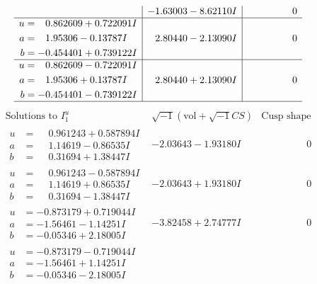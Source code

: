 \documentclass[1p]{elsarticle_modified}
\theoremstyle{definition}
\newcommand{\I}{\sqrt{-1}}
\begin{document}
$$\begin{array}{c|c|c}
 & -1.63003 - 8.62110 I & \phantom{-0.000000 } 0 \\ \hline\begin{aligned}
u &= \phantom{-}0.862609 + 0.722091 I \\
a &= \phantom{-}1.95306 - 0.13787 I \\
b &= -0.454401 + 0.739122 I\end{aligned}
 & \phantom{-}2.80440 - 2.13090 I & \phantom{-0.000000 } 0 \\ \hline\begin{aligned}
u &= \phantom{-}0.862609 - 0.722091 I \\
a &= \phantom{-}1.95306 + 0.13787 I \\
b &= -0.454401 - 0.739122 I\end{aligned}
 & \phantom{-}2.80440 + 2.13090 I & \phantom{-0.000000 } 0\\
 \hline 
 \end{array}$$\newpage$$\begin{array}{c|c|c}  
\text{Solutions to }I^u_{1}& \I (\text{vol} + \sqrt{-1}CS) & \text{Cusp shape}\\
 \hline 
\begin{aligned}
u &= \phantom{-}0.961243 + 0.587894 I \\
a &= \phantom{-}1.14619 - 0.86535 I \\
b &= \phantom{-}0.31694 + 1.38447 I\end{aligned}
 & -2.03643 - 1.93180 I & \phantom{-0.000000 } 0 \\ \hline\begin{aligned}
u &= \phantom{-}0.961243 - 0.587894 I \\
a &= \phantom{-}1.14619 + 0.86535 I \\
b &= \phantom{-}0.31694 - 1.38447 I\end{aligned}
 & -2.03643 + 1.93180 I & \phantom{-0.000000 } 0 \\ \hline\begin{aligned}
u &= -0.873179 + 0.719044 I \\
a &= -1.56461 - 1.14251 I \\
b &= -0.05346 + 2.18005 I\end{aligned}
 & -3.82458 + 2.74777 I & \phantom{-0.000000 } 0 \\ \hline\begin{aligned}
u &= -0.873179 - 0.719044 I \\
a &= -1.56461 + 1.14251 I \\
b &= -0.05346 - 2.18005 I\end{aligned}

\end{array}$$
\end{document}
